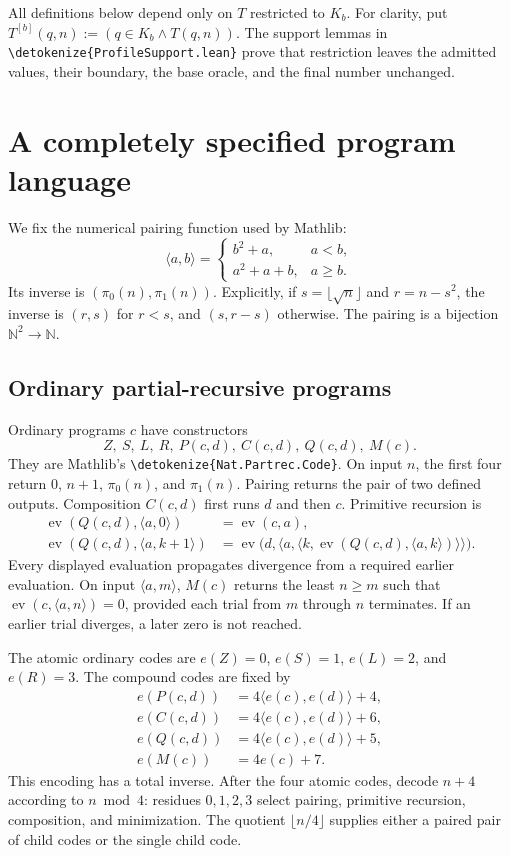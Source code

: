 \documentclass[11pt]{article}
\newcommand{\N}{\mathbb N}
\newcommand{\ev}{\operatorname{ev}}
\newcommand{\pair}[2]{\langle #1,#2\rangle}
\newcommand{\code}[1]{{\small\expandafter\nolinkurl\expandafter{\detokenize{#1}}}}
\begin{document}
All definitions below depend only on $T$ restricted to $K_b$. For clarity,
put $T^{[b]}(q,n):=(q\in K_b\wedge T(q,n))$. The support lemmas in
\code{ProfileSupport.lean} prove that restriction leaves the admitted values,
their boundary, the base oracle, and the final number unchanged.

\section{A completely specified program language}\label{sec:machine}

We fix the numerical pairing function used by Mathlib:
\begin{equation}\label{eq:pair}
 \pair ab=
 \begin{cases}b^2+a,&a<b,\\a^2+a+b,&a\geq b.\end{cases}
\end{equation}
Its inverse is $(\pi_0(n),\pi_1(n))$. Explicitly, if $s=\lfloor\sqrt n\rfloor$
and $r=n-s^2$, the inverse is $(r,s)$ for $r<s$, and $(s,r-s)$ otherwise.
The pairing is a bijection $\N^2\to\N$.

\subsection{Ordinary partial-recursive programs}

Ordinary programs $c$ have constructors
\[
 Z,\ S,\ L,\ R,\ P(c,d),\ C(c,d),\ Q(c,d),\ M(c).
\]
They are Mathlib's \code{Nat.Partrec.Code}. On input $n$, the first four
return $0$, $n+1$, $\pi_0(n)$, and $\pi_1(n)$. Pairing returns the pair of
two defined outputs. Composition $C(c,d)$ first runs $d$ and then $c$.
Primitive recursion is
\begin{align*}
 \ev(Q(c,d),\pair a0)&=\ev(c,a),\\
 \ev(Q(c,d),\pair a{k+1})&=
   \ev\bigl(d,\pair a{\pair k{\ev(Q(c,d),\pair ak)}}\bigr).
\end{align*}
Every displayed evaluation propagates divergence from a required earlier
evaluation. On input $\pair am$, $M(c)$ returns the least $n\geq m$ such
that $\ev(c,\pair an)=0$, provided each trial from $m$ through $n$ terminates.
If an earlier trial diverges, a later zero is not reached.

The atomic ordinary codes are $e(Z)=0$, $e(S)=1$, $e(L)=2$, and $e(R)=3$.
The compound codes are fixed by
\begin{align*}
e(P(c,d))&=4\pair{e(c)}{e(d)}+4,\\
e(C(c,d))&=4\pair{e(c)}{e(d)}+6,\\
e(Q(c,d))&=4\pair{e(c)}{e(d)}+5,\\
e(M(c))&=4e(c)+7.
\end{align*}
This encoding has a total inverse. After the four atomic codes, decode
$n+4$ according to $n\bmod4$: residues $0,1,2,3$ select pairing, primitive
recursion, composition, and minimization. The quotient $\lfloor n/4\rfloor$
supplies either a paired pair of child codes or the single child code.
\end{document}

